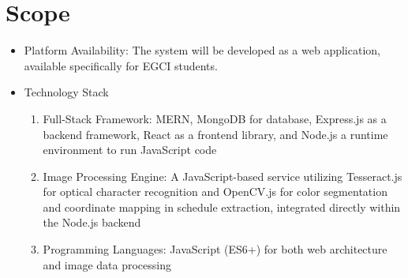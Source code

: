 \section{Scope}
\begin{itemize}
	\item Platform Availability: The system will be developed as a web application, available specifically for EGCI students.
	\item Technology Stack
	\begin{enumerate}[label=\alph*.]
	\item Full-Stack Framework: MERN, MongoDB for database, Express.js as a backend framework, React as a frontend library, and Node.js a runtime environment to run JavaScript code
	\item Image Processing Engine: A JavaScript-based service utilizing Tesseract.js for optical character recognition and OpenCV.js for color segmentation and coordinate mapping in schedule extraction, integrated directly within the Node.js backend
	\item Programming Languages: JavaScript (ES6+) for both web architecture and image data processing
	\end{enumerate}
    
\end{itemize}

